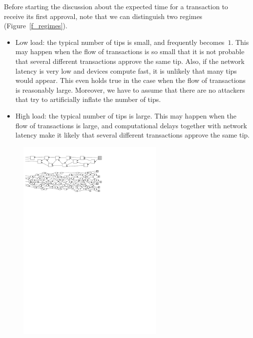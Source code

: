 \documentclass[12pt]{article}
\begin{document}
\begin{CJK}{UTF8}{bkai}
Before starting the discussion about 
the expected time for a transaction to 
receive its first approval, 
note that
we can distinguish 
two regimes 
(Figure~\ref{f_regimes}).
\begin{itemize}
 \item Low load: the typical number of
tips is small, and frequently becomes~$1$.
This may happen when the flow of transactions is so small
 that it is not probable that several different transactions
approve the same tip. Also, if the network latency is very
low and devices compute fast, it is unlikely
that many tips would appear. This even holds true in the case when the flow
of transactions is reasonably large. Moreover, 
we have to assume that there are no attackers 
that try to artificially inflate the number of tips.
 \item High load: the typical number of tips is large.
This may happen when
the flow of transactions is 
large, and computational delays together with network
latency make it likely that several different transactions
approve the same tip.
\end{itemize}
\begin{figure}
 \centering \includegraphics[width=0.64\textwidth]{regimes} 

\end{figure}
\end{CJK}
\end{document}
